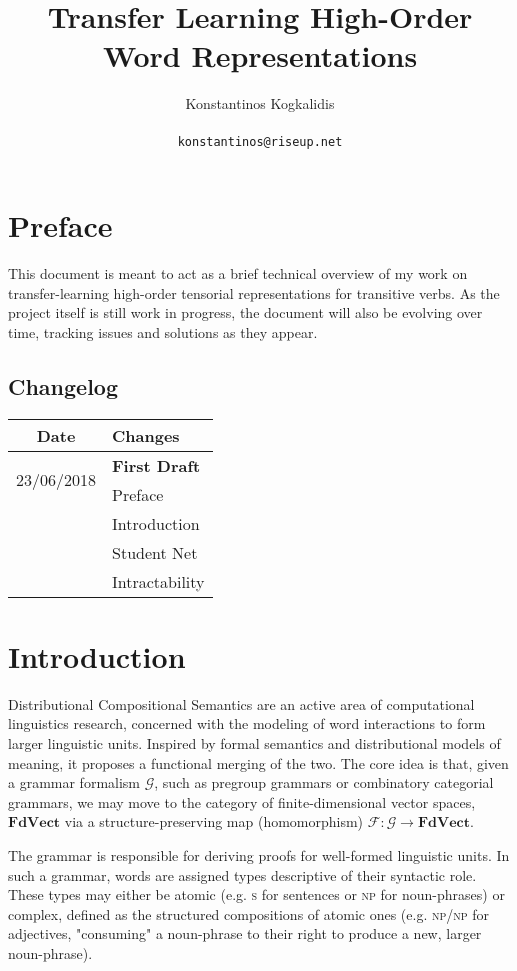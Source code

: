 \documentclass[a4paper,11pt]{article}
\title{Transfer Learning High-Order Word Representations}
\date{}
\author{Konstantinos Kogkalidis\\
       \\
       \texttt{konstantinos@riseup.net}
}
\begin{document}
\maketitle

\section{Preface}
This document is meant to act as a brief technical overview of my work on transfer-learning high-order tensorial representations for transitive verbs. As the project itself is still work in progress, the document will also be evolving over time, tracking issues and solutions as they appear. 

\subsection{Changelog}
    \begin{tabularx}{\linewidth}{|c|X|}
      \toprule
      \textbf{Date} & \textbf{Changes} \\
      \midrule
      \multirow{2}{*}{23/06/2018} &  \textbf{First Draft} \\
       & \quad Preface \\
       & \quad Introduction \\
       & \quad Student Net \\
       & \quad Intractability \\
       \midrule
    \end{tabularx}
    
\section{Introduction}
Distributional Compositional Semantics are an active area of computational linguistics research, concerned with the modeling of word interactions to form larger linguistic units. Inspired by formal semantics and distributional models of meaning, it proposes a functional merging of the two. The core idea is that, given a grammar formalism $\mathcal{G}$, such as pregroup grammars or combinatory categorial grammars, we may move to the category of finite-dimensional vector spaces, $\mathbf{FdVect}$ via a structure-preserving map (homomorphism) $\mathcal{F}: \mathcal{G} \to \mathbf{FdVect}$.

The grammar is responsible for deriving proofs for well-formed linguistic units. In such a grammar, words are assigned types descriptive of their syntactic role. These types may either be atomic (e.g. \textsc{s} for sentences or \textsc{np} for noun-phrases) or complex, defined as the structured compositions of atomic ones (e.g. \textsc{np}/\textsc{np} for adjectives, "consuming" a noun-phrase to their right to produce a new, larger noun-phrase).
\end{document}
